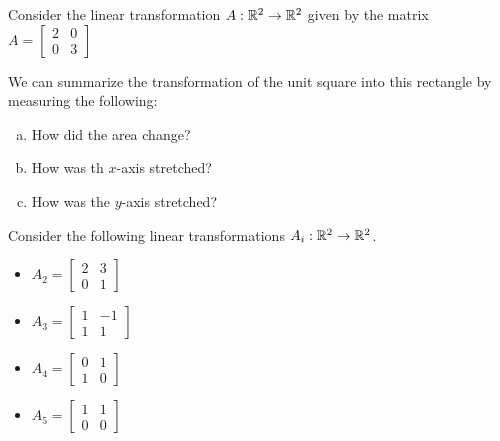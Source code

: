 
\begin{applicationActivities}{1}{26}

\begin{activity}{0}
Consider the linear transformation $A : \mathbb{R}^2 \rightarrow \mathbb{R}^2$ given by the matrix $A = \begin{bmatrix} 2 & 0 \\ 0 & 3 \end{bmatrix}$

\begin{center}
\end{center}

We can summarize the transformation of the unit square into this rectangle by measuring the following:

\begin{enumerate}[(a)]
\item How did the area change?
\item How was th $x$-axis stretched?
\item How was the $y$-axis stretched?
\end{enumerate}

\end{activity}


\begin{activity}{0}
Consider the following linear transformations  $A_i: \mathbb{R}^2 \rightarrow \mathbb{R}^2$.
\begin{itemize}
\item $A_2 = \begin{bmatrix} 2 & 3 \\ 0 & 1 \end{bmatrix}$
\item $A_3 = \begin{bmatrix} 1 & -1 \\ 1 & 1 \end{bmatrix}$
\item $A_4 = \begin{bmatrix} 0 & 1 \\ 1 & 0 \end{bmatrix}$
\item $A_5 = \begin{bmatrix} 1 & 1 \\ 0 & 0 \end{bmatrix}$
\end{itemize}


\end{activity}
\end{applicationActivities}
